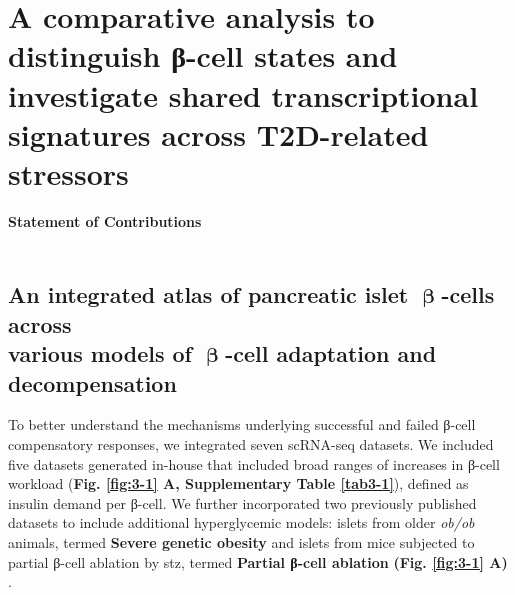 
\chapter{A comparative analysis to distinguish β-cell states and investigate shared transcriptional signatures across T2D-related stressors
}
\label{chapter3}
\newpage

\begin{Comment2}
\vspace{3mm}
\label{contr:chapter2}
\hspace{-3mm}
\textbf{Statement of Contributions} \\\\

\end{Comment2}

\clearpage

\section{An integrated atlas of pancreatic islet \( \mathbf{\upbeta} \)-cells across\\various models of \( \mathbf{\upbeta} \)-cell adaptation and decompensation}
\label{sec:int_atlas}
To better understand the mechanisms underlying successful and failed β-cell compensatory responses, we integrated seven scRNA-seq datasets. We included five datasets generated in-house that included broad ranges of increases in β-cell workload (\textbf{Fig. \ref{fig:3-1} A, Supplementary Table \ref{tab3-1}}), defined as insulin demand per β-cell. We further incorporated two previously published datasets to include  additional hyperglycemic models: islets from older \textit{ob/ob} animals, termed \textbf{Severe genetic obesity} \textbf{\cite{chung_endocrine-exocrine_2020}} and islets from mice subjected to partial β-cell ablation by \gls{stz}, termed \textbf{Partial β-cell ablation} \textbf{(Fig. \ref{fig:3-1} A)} \textbf{\cite{sachs_targeted_2020}}.

\vspace{0.5cm}

